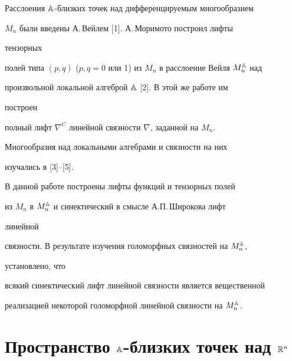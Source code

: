  


\date{} 




\pagestyle{plain} %


 




\maketitle 


\label{begin} 


 


 


Расслоения $\Bbb A$-близких точек над дифференцируемым многообразием 


$M_n$ были введены А.\,Вейлем [1]. А.\,Моримото построил лифты 


тензорных  


полей типа $(p,q)$ ($p,q=0$ или 1) из $M_n$ в расслоение Вейля $M^{\Bbb A}_n$ над  


произвольной локальной алгеброй $\Bbb A$ [2]. В этой же работе им 


построен 


полный лифт $\nabla^C$ линейной связности $\nabla$, заданной на $M_n$. 


Многообразия над локальными алгебрами и связности на них 


изучались в [3]--[5]. 


 


В данной работе построены лифты функций и тензорных полей 


из $M_n$ в $M^{\Bbb A}_n$ и синектический в смысле А.П.\,Широкова лифт 


линейной 


связности. В результате изучения голоморфных связностей на $M^{\Bbb A}_n$, 


установлено, что 


всякий синектический лифт линейной связности является вещественной 


реализацией некоторой голоморфной линейной связности на $M^{\Bbb A}_n$. 


 


\section{Пространство $\Bbb A$-близких точек над $\Bbb R^n$} 


